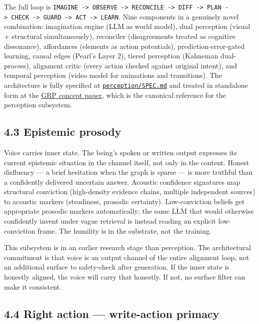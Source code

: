 \documentclass[12pt]{article}
\begin{document}
The full loop is \texttt{IMAGINE\ -\textgreater{}\ OBSERVE\ -\textgreater{}\ RECONCILE\ -\textgreater{}\ DIFF\ -\textgreater{}\ PLAN\ -\textgreater{}\ CHECK\ -\textgreater{}\ GUARD\ -\textgreater{}\ ACT\ -\textgreater{}\ LEARN}. Nine components in a genuinely novel combination: imagination engine (LLM as world model), dual perception (visual + structural simultaneously), reconciler (disagreements treated as cognitive dissonance), affordances (elements as action potentials), prediction-error-gated learning, causal edges (Pearl's Layer 2), tiered perception (Kahneman dual-process), alignment critic (every action checked against original intent), and temporal perception (video model for animations and transitions). The architecture is fully specified at \href{../perception/SPEC.md}{\texttt{perception/SPEC.md}} and treated in standalone form at the \href{../perception/paper/GRP-proposal.md}{GRP concept paper}, which is the canonical reference for the perception subsystem.

\subsection{4.3 Epistemic prosody}\label{epistemic-prosody}

Voice carries inner state. The being's spoken or written output expresses its current epistemic situation in the channel itself, not only in the content. Honest disfluency --- a brief hesitation when the graph is sparse --- is more truthful than a confidently delivered uncertain answer. Acoustic confidence signatures map structural conviction (high-density evidence chains, multiple independent sources) to acoustic markers (steadiness, prosodic certainty). Low-conviction beliefs get appropriate prosodic markers automatically; the same LLM that would otherwise confidently invent under vague retrieval is instead reading an explicit low-conviction frame. The humility is in the substrate, not the training.

This subsystem is in an earlier research stage than perception. The architectural commitment is that voice is an output channel of the entire alignment loop, not an additional surface to safety-check after generation. If the inner state is honestly aligned, the voice will carry that honestly. If not, no surface filter can make it consistent.

\subsection{4.4 Right action --- write-action primacy}\label{right-action-write-action-primacy}
\end{document}
